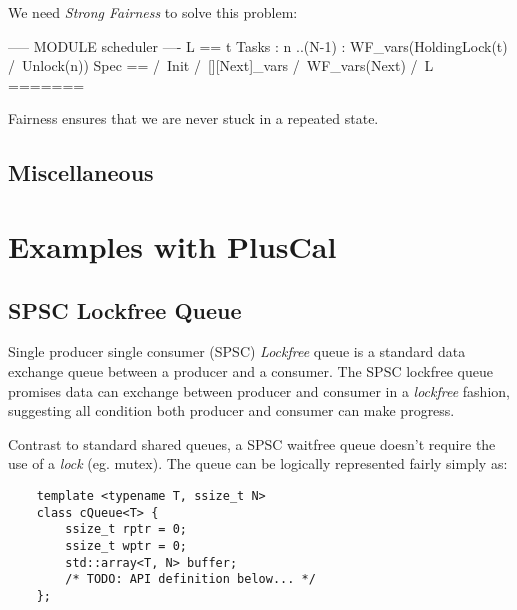 \documentclass{report}
\begin{document}
We need \textit{Strong Fairness} to solve this problem:
\begin{tla}
----- MODULE scheduler ---- 
L ==
    \A t \in Tasks :
        \A n ..(N-1) :
            WF_vars(HoldingLock(t) /\ Unlock(n))
Spec ==
  /\ Init
  /\ [][Next]_vars
  /\ WF_vars(Next)
  /\ L 
======= 
\end{tla}
\begin{tlatex}
\@x{}\moduleLeftDash{}\moduleRightDash\@xx{}%
%
%
%
%
%
%
%
%
%
\@x{}\bottombar\@xx{}%
\end{tlatex}
\newline

Fairness ensures that we are never stuck in a repeated state.

\chapter{Miscellaneous}

\part{Examples with PlusCal}

\chapter{SPSC Lockfree Queue}

Single producer single consumer (SPSC) \textit{Lockfree} queue is a standard
data exchange queue between a producer and a consumer. The SPSC lockfree queue
promises data can exchange between producer and consumer in a \textit{lockfree}
fashion, suggesting all condition both producer and consumer can make
progress.\newline

Contrast to standard shared queues, a SPSC waitfree queue doesn't require the
use of a \textit{lock} (eg. mutex). The queue can be logically represented
fairly simply as:

\begin{lstlisting}
    template <typename T, ssize_t N>
    class cQueue<T> { 
        ssize_t rptr = 0; 
        ssize_t wptr = 0; 
        std::array<T, N> buffer;
        /* TODO: API definition below... */
    };
\end{lstlisting}
\end{document}
